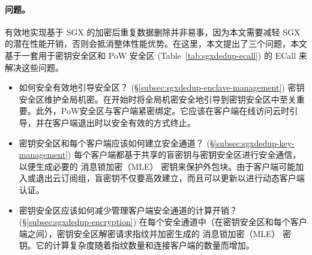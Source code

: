 \paragraph*{问题。} 有效地​​实现基于 SGX 的加密后重复数据删除并非易事，因为本文需要减轻 SGX 的潜在性能开销，否则会抵消整体性能优势。在这里，本文提出了三个问题，本文基于一套用于密钥安全区和 PoW 安全区 (Table~\ref{tab:sgxdedup-ecall}) 的 ECall 来解决这些问题。

\begin{itemize}[leftmargin=*]
\item 如何安全有效地引导安全区？ (\S\ref{subsec:sgxdedup-enclave-management})
  密钥安全区维护全局机密。在开始时将全局机密安全地引导到密钥安全区中至关重要。此外，PoW安全区与客户端紧密绑定。它应该在客户端在线访问云时引导，并在客户端退出时以安全有效的方式终止。
\item 密钥安全区和每个客户端应该如何建立安全通道？ (\S\ref{subsec:sgxdedup-key-management})
  每个客户端都基于共享的盲密钥与密钥安全区进行安全通信，以便生成必要的 消息锁加密（MLE） 密钥来保护外包块。由于客户端可能加入或退出云订阅组，盲密钥不仅要高效建立，而且可以更新以进行动态客户端认证。
\item 密钥安全区应该如何减少管理客户端安全通道的计算开销？ (\S\ref{subsec:sgxdedup-encryption})
  在每个安全通道中（在密钥安全区和每个客户端之间），密钥安全区解密请求指纹并加密生成的 消息锁加密（MLE） 密钥。它的计算复杂度随着指纹数量和连接客户端的数量而增加。
\end{itemize}
